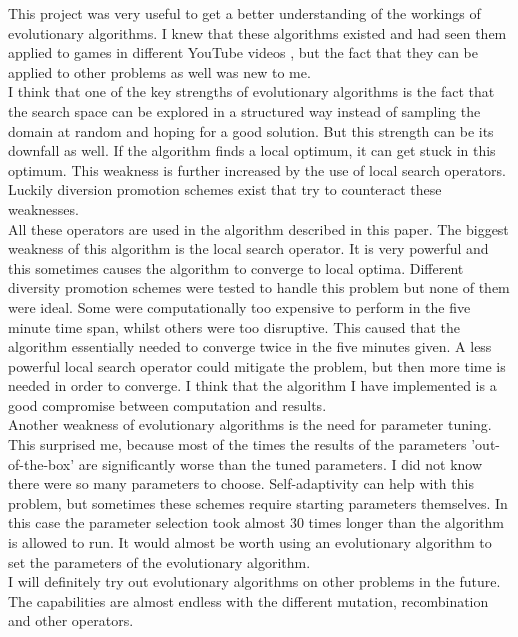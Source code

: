\documentclass[a4paper,10pt]{article}
\newcommand{\ReplaceMe}[1]{{\color{blue}#1}}
\begin{document}

This project was very useful to get a better understanding of the workings of evolutionary algorithms. I knew that these algorithms existed and had seen them applied to games in different YouTube videos \cite{video1, video2}, but the fact that they can be applied to other problems as well was new to me. \\
I think that one of the key strengths of evolutionary algorithms is the fact that the search space can be explored in a structured way instead of sampling the domain at random and hoping for a good solution. But this strength can be its downfall as well. If the algorithm finds a local optimum, it can get stuck in this optimum. This weakness is further increased by the use of local search operators. Luckily diversion promotion schemes exist that try to counteract these weaknesses.\\
All these operators are used in the algorithm described in this paper. The biggest weakness of this algorithm is the local search operator. It is very powerful and this sometimes causes the algorithm to converge to local optima. Different diversity promotion schemes were tested to handle this problem but none of them were ideal. Some were computationally too expensive to perform in the five minute time span, whilst others were too disruptive. This caused that the algorithm essentially needed to converge twice in the five minutes given. A less powerful local search operator could mitigate the problem, but then more time is needed in order to converge. I think that the algorithm I have implemented is a good compromise between computation and results.\\
Another weakness of evolutionary algorithms is the need for parameter tuning.  This surprised me, because most of the times the results of the parameters 'out-of-the-box' are significantly worse than the tuned parameters. I did not know there were so many parameters to choose. Self-adaptivity can help with this problem, but sometimes these schemes require starting parameters themselves. In this case the parameter selection took almost 30 times longer than the algorithm is allowed to run. It would almost be worth using an evolutionary algorithm to set the parameters of the evolutionary algorithm.\\
I will definitely try out evolutionary algorithms on other problems in the future. The capabilities are almost endless with the different mutation, recombination and other operators. 


\newpage


\end{document}
